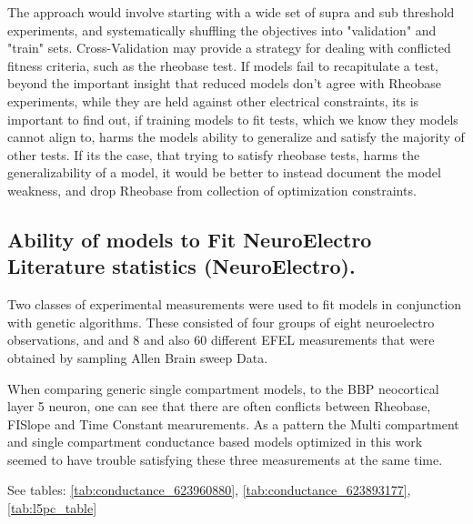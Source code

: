 The approach would  involve starting with a wide set of supra and sub threshold experiments, and systematically shuffling the objectives into "validation" and "train" sets. Cross-Validation may provide a strategy for dealing with  conflicted fitness criteria, such as the rheobase test. If models fail to recapitulate a test, beyond the important insight that  reduced models don't agree with Rheobase experiments, while they are held against other electrical constraints, its is important to find out, if training models to fit tests, which we know they models cannot align to, harms the models ability to generalize and satisfy the majority of other tests. If its the case, that trying to satisfy rheobase tests, harms the generalizability of a model, it would be better to instead document the model weakness, and drop Rheobase from collection of optimization constraints.


\subsection{Ability of models to Fit NeuroElectro Literature statistics (NeuroElectro).}
Two classes of experimental measurements were used to fit models in conjunction with genetic algorithms. These consisted of four groups of eight neuroelectro observations, and and $8$ and also $60$ different EFEL measurements that were obtained by sampling Allen Brain sweep Data.


When comparing generic single compartment models, to the BBP neocortical layer 5 neuron, one can see that there are often conflicts between Rheobase, FISlope and Time Constant mearurements. As a pattern the Multi compartment and single compartment conductance based models optimized in this work seemed to have trouble satisfying these three measurements at the same time.

See tables: \ref{tab:conductance_623960880}, \ref{tab:conductance_623893177}, \ref{tab:l5pc_table}





